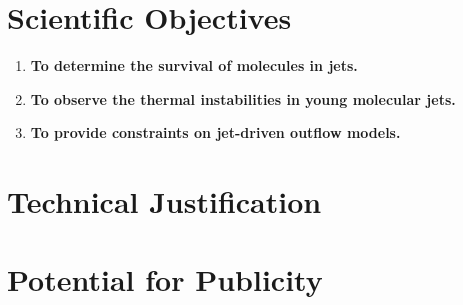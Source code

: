 \documentclass[12pt,a4paper]{article}
\begin{document}



\section{Scientific Objectives}
\begin{enumerate}
\item \textbf{\large{To determine the survival of molecules in jets.}}



\item \textbf{\large{To observe the thermal instabilities in young
    molecular jets.}}


\item \textbf{\large{To provide constraints on jet-driven outflow models.}}
\end{enumerate}


\section{Technical Justification}



\section{Potential for Publicity}

\end{document}
